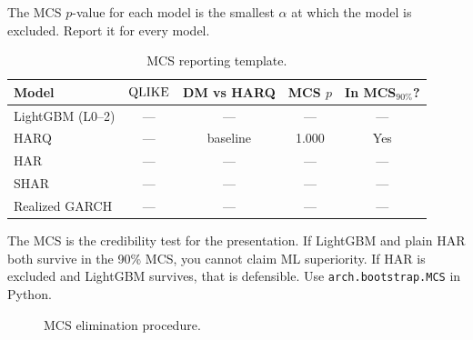 The MCS $p$-value for each model is the smallest $\alpha$ at which the model is excluded.
Report it for every model.

\begin{table}[htbp]
\centering
\caption{MCS reporting template.}
\label{tab:mcs-template}
\small
\begin{tabular}{@{}lcccc@{}}
\toprule
\textbf{Model} & $\operatorname{QLIKE}$ & \textbf{DM vs HARQ} & \textbf{MCS $p$} & \textbf{In MCS$_{90\%}$?} \\
\midrule
LightGBM (L0--2) & ---   & ---      & ---   & --- \\
HARQ              & ---   & baseline & 1.000 & Yes \\
HAR               & ---   & ---      & ---   & --- \\
SHAR              & ---   & ---      & ---   & --- \\
Realized GARCH    & ---   & ---      & ---   & --- \\
\bottomrule
\end{tabular}
\end{table}

\begin{keyidea}
The MCS is the credibility test for the presentation.
If LightGBM and plain HAR both survive in the 90\% MCS, you cannot claim ML superiority.
If HAR is excluded and LightGBM survives, that is defensible.
Use \texttt{arch.bootstrap.MCS} in Python.
\end{keyidea}

\begin{figure}[htbp]
\centering
{}
\caption{MCS elimination procedure.}
\label{fig:mcs-flowchart}
\end{figure}


